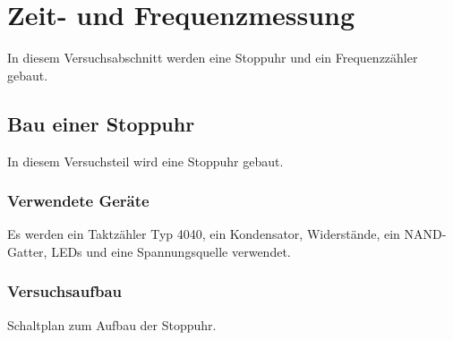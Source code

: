 \documentclass[12pt,a4paper]{article}
\begin{document}
\section{Zeit- und Frequenzmessung}

In diesem Versuchsabschnitt werden eine Stoppuhr und ein Frequenzzähler gebaut.

\subsection{Bau einer Stoppuhr}

In diesem Versuchsteil wird eine Stoppuhr gebaut.

\subsubsection*{Verwendete Geräte}

Es werden ein Taktzähler Typ 4040, ein Kondensator, Widerstände, ein NAND-Gatter, LEDs und eine Spannungsquelle verwendet.

\subsubsection*{Versuchsaufbau}

Schaltplan zum Aufbau der Stoppuhr.
\end{document}
